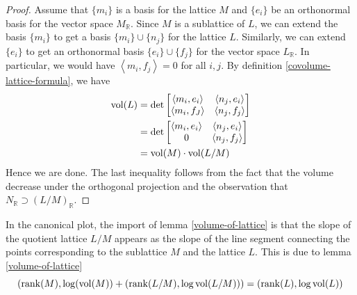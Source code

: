\begin{proof}
    Assume that $\{m_i\}$ is a basis for the lattice $M$ and $\{e_i\}$ be an orthonormal basis for the vector space
    $M_\mathbb{R}$. Since $M$ is a sublattice of $L$, we can extend the basis $\{m_i\}$ to get a
    basis $\{m_i\} \cup \{n_j\}$ for the lattice $L$. Similarly, we can extend  $\{e_i\}$ to get an orthonormal
    basis $\{e_i\} \cup \{f_j\}$ for the vector space $L_\mathbb{R}$. In particular, we would have
    $\left\langle m_i,f_j \right\rangle =0$ for all $i,j$.
    By definition \ref{covolume-lattice-formula}, we have
    \begin{align*}
        \operatorname{vol}(L) & = \det\begin{bmatrix}
                            \left\langle m_i,e_i\right\rangle  & \left\langle n_j,e_i\right\rangle \\
                            \left\langle m_i,f_J \right\rangle & \left\langle n_j,f_j\right\rangle
                        \end{bmatrix} \\
                & = \det\begin{bmatrix}
                            \left\langle m_i,e_i\right\rangle & \left\langle n_j,e_i\right\rangle \\
                            0                                 & \left\langle n_j,f_j\right\rangle
                        \end{bmatrix}  \\
                & =\operatorname{vol}(M)\cdot \operatorname{vol}(L/M)
    \end{align*}
    Hence we are done. The last inequality follows from the fact that the volume decrease under the orthogonal projection and the observation that
    $N_\mathbb{R} \supset (L/M)_\mathbb{R}$.
\end{proof}
In the canonical plot, the import of lemma \ref{volume-of-lattice} is that the slope of the quotient lattice $L/M$ appears as
the slope of the line segment connecting the points corresponding to the sublattice $M$ and the lattice $L$. This is due to lemma \ref{volume-of-lattice}
\[(\operatorname{rank}(M),\log(\operatorname{vol}(M))+ (\operatorname{rank}(L/M),\log\operatorname{vol}(L/M)))= (\operatorname{rank}(L),\log\operatorname{vol}(L))\]
